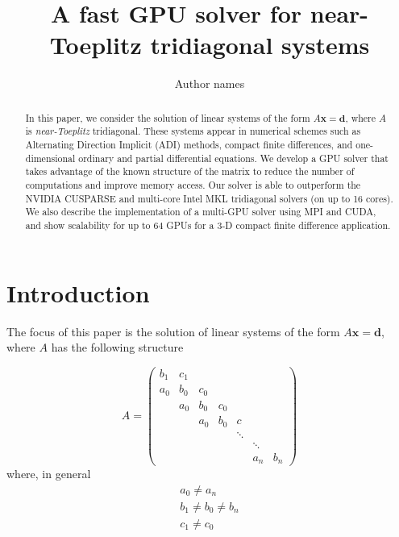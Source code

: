 \documentclass{elsarticle}
\begin{document}
\begin{frontmatter}
\author{Author names}
\title{A fast GPU solver for near-Toeplitz tridiagonal systems}
\maketitle

\begin{abstract}
    In this paper, we consider the solution of linear
    systems of the form $A\bm{x} = \bm{d}$,
    where $A$ is \emph{near-Toeplitz} tridiagonal.
    These systems appear in numerical schemes
    such as
    Alternating Direction Implicit (ADI) methods,
    compact finite differences,
    and one-dimensional ordinary
    and partial differential equations.
    We develop a GPU solver that takes advantage
    of the known structure of the matrix
    to reduce the number of computations
    and improve memory access.
    Our solver is able to outperform
    the NVIDIA CUSPARSE and
    multi-core Intel MKL tridiagonal solvers
    (on up to 16 cores).
    We also describe the implementation of a multi-GPU solver
    using MPI and CUDA,
    and show scalability for up to 64 GPUs
    for a 3-D compact finite difference application.
\end{abstract}

\end{frontmatter}
    
\section{Introduction}

The focus of this paper is the solution of
linear systems of the form $A\bm{x} = \bm{d}$,
where $A$ has the following structure

\begin{equation} \label{eqn:toeplitz-matrix}
A = 
\begin{pmatrix}
     b_1 & c_1  \\
     a_0 & b_0  &  c_0  \\
         & a_0  &  b_0 &  c_0  \\
         &      &  a_0 &  b_0 &  c    \\
         &      &      &      &  \ddots \\
         &      &      &      &     &  \ddots  \\
         &      &      &      &     &  a_n  &  b_n
\end{pmatrix}
\end{equation}
%
where, in general
\begin{align*}
    & a_0 \neq a_n & \\
    & b_1 \neq b_0 \neq b_n &\\
    & c_1 \neq c_0 &
\end{align*}
\end{document}
